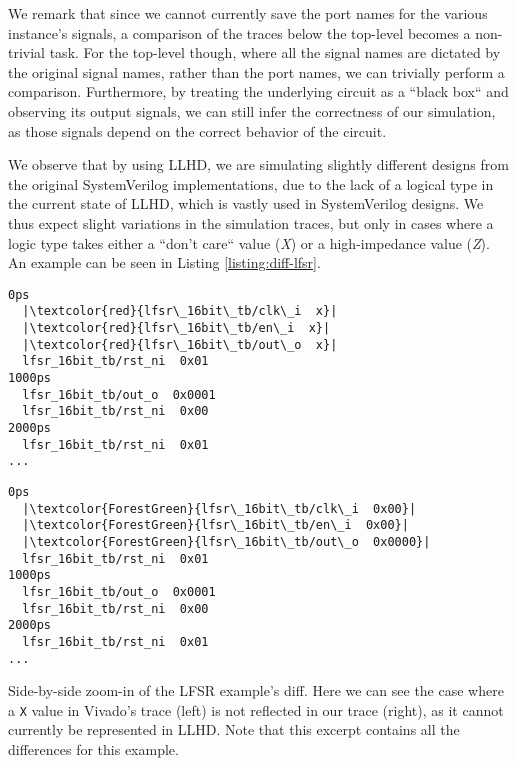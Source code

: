 We remark that since we cannot currently save the port names for the various instance's signals, a comparison of the traces below the top-level becomes a non-trivial task. For the top-level though, where all the signal names are dictated by the original signal names, rather than the port names, we can trivially perform a comparison. Furthermore, by treating the underlying circuit as a “black box“ and observing its output signals, we can still infer the correctness of our simulation, as those signals depend on the correct behavior of the circuit.

We observe that by using LLHD, we are simulating slightly different designs from the original SystemVerilog implementations, due to the  lack of a logical type in the current state of LLHD, which is vastly used in SystemVerilog designs. We thus expect slight variations in the simulation traces, but only in cases where a logic type takes either a “don't care“ value (\textit{X}) or a high-impedance value (\textit{Z}). An example can be seen in Listing \ref{listing:diff-lfsr}.

\begin{listing}[ht]
  \lstset{
    escapeinside=||,
    basicstyle=\footnotesize\ttfamily,
    stepnumber=1
  }
  \begin{minipage}{0.45\textwidth}
    \begin{lstlisting}
0ps
  |\textcolor{red}{lfsr\_16bit\_tb/clk\_i  x}|
  |\textcolor{red}{lfsr\_16bit\_tb/en\_i  x}|
  |\textcolor{red}{lfsr\_16bit\_tb/out\_o  x}|
  lfsr_16bit_tb/rst_ni  0x01
1000ps
  lfsr_16bit_tb/out_o  0x0001
  lfsr_16bit_tb/rst_ni  0x00
2000ps
  lfsr_16bit_tb/rst_ni  0x01
...
        \end{lstlisting}
  \end{minipage}
  \hfill
  \begin{minipage}{0.45\textwidth}
    \begin{lstlisting}
0ps
  |\textcolor{ForestGreen}{lfsr\_16bit\_tb/clk\_i  0x00}|
  |\textcolor{ForestGreen}{lfsr\_16bit\_tb/en\_i  0x00}|
  |\textcolor{ForestGreen}{lfsr\_16bit\_tb/out\_o  0x0000}|
  lfsr_16bit_tb/rst_ni  0x01
1000ps
  lfsr_16bit_tb/out_o  0x0001
  lfsr_16bit_tb/rst_ni  0x00
2000ps
  lfsr_16bit_tb/rst_ni  0x01
...
        \end{lstlisting}
  \end{minipage}
  \caption[Side-by-side zoom-in of the LFSR example's diff.]{Side-by-side zoom-in of the LFSR example's diff. Here we can see the case where a \texttt{X} value in Vivado's trace (left) is not reflected in our trace (right), as it cannot currently be represented in LLHD. Note that this excerpt contains all the differences for this example.}
  \label{listing:diff-lfsr}
\end{listing}

